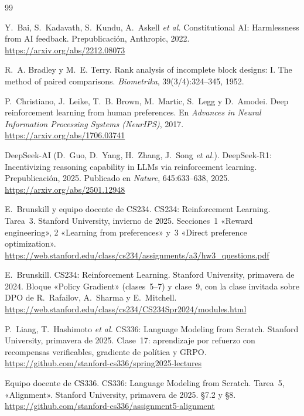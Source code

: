 \begin{thebibliography}{99}
\small

Y.~Bai, S.~Kadavath, S.~Kundu, A.~Askell \emph{et al.}
\newblock Constitutional AI: Harmlessness from AI feedback.
\newblock Prepublicación, Anthropic, 2022.
\newblock \url{https://arxiv.org/abs/2212.08073}

R.~A. Bradley y M.~E. Terry.
\newblock Rank analysis of incomplete block designs: I. The method of paired comparisons.
\newblock \emph{Biometrika}, 39(3/4):324--345, 1952.

P.~Christiano, J.~Leike, T.~B. Brown, M.~Martic, S.~Legg y D.~Amodei.
\newblock Deep reinforcement learning from human preferences.
\newblock En \emph{Advances in Neural Information Processing Systems (NeurIPS)}, 2017.
\newblock \url{https://arxiv.org/abs/1706.03741}

DeepSeek-AI (D.~Guo, D.~Yang, H.~Zhang, J.~Song \emph{et al.}).
\newblock DeepSeek-R1: Incentivizing reasoning capability in LLMs via reinforcement learning.
\newblock Prepublicación, 2025. Publicado en \emph{Nature}, 645:633--638, 2025.
\newblock \url{https://arxiv.org/abs/2501.12948}

E.~Brunskill y equipo docente de CS234.
\newblock CS234: Reinforcement Learning. Tarea~3.
\newblock Stanford University, invierno de 2025. Secciones~1 «Reward engineering», 2 «Learning from preferences» y~3 «Direct preference optimization».
\newblock \url{https://web.stanford.edu/class/cs234/assignments/a3/hw3_questions.pdf}

E.~Brunskill.
\newblock CS234: Reinforcement Learning.
\newblock Stanford University, primavera de 2024. Bloque «Policy Gradient» (clases~5--7) y clase~9, con la clase invitada sobre DPO de R.~Rafailov, A.~Sharma y E.~Mitchell.
\newblock \url{https://web.stanford.edu/class/cs234/CS234Spr2024/modules.html}

P.~Liang, T.~Hashimoto \emph{et al.}
\newblock CS336: Language Modeling from Scratch.
\newblock Stanford University, primavera de 2025. Clase~17: aprendizaje por refuerzo con recompensas verificables, gradiente de política y GRPO.
\newblock \url{https://github.com/stanford-cs336/spring2025-lectures}

Equipo docente de CS336.
\newblock CS336: Language Modeling from Scratch. Tarea~5, «Alignment».
\newblock Stanford University, primavera de 2025. §7.2 y §8.
\newblock \url{https://github.com/stanford-cs336/assignment5-alignment}


\end{thebibliography}
